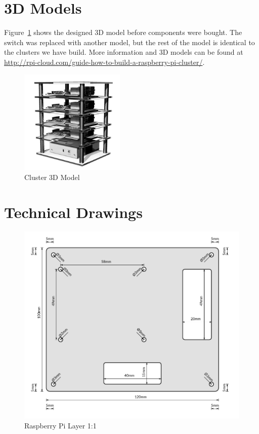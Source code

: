 \section*{3D Models}
Figure~\ref{fig:cluster_3d_model} shows the designed 3D model before components were bought. The switch was replaced with another model, but the rest of the model is identical to the clusters we have build. More information and 3D models can be found at \url{http://rpi-cloud.com/guide-how-to-build-a-raspberry-pi-cluster/}.

\begin{figure}[H]
	\includegraphics[width=5cm]{figures/cluster/cluster3d_back}
	\centering
	\caption{Cluster 3D Model}
	\label{fig:cluster_3d_model}
\end{figure}



\section*{Technical Drawings}

\begin{figure}[H]
	\centering
	\includegraphics[width=16cm]{figures/cluster/raspberry_layer}
	\caption{Raspberry Pi Layer 1:1}
	\label{fig:cluster_raspberry_layer}
\end{figure}

